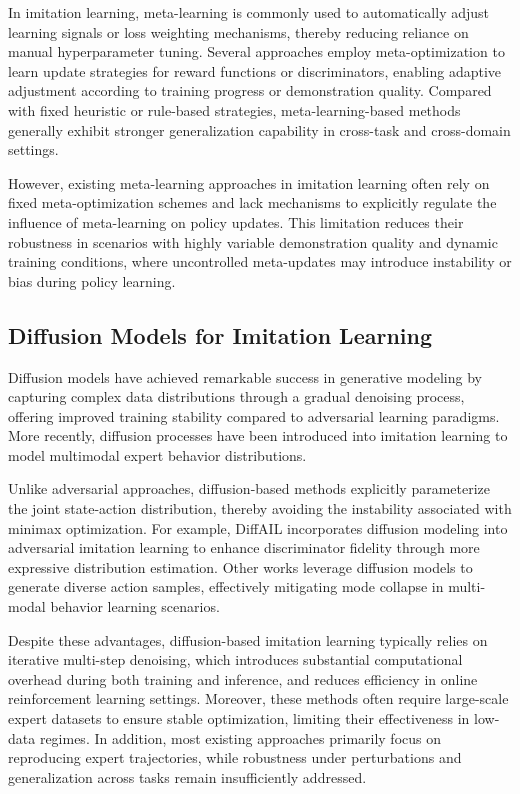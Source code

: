 \documentclass[lettersize,journal]{IEEEtran}
\begin{document}
In imitation learning, meta-learning is commonly used to automatically adjust learning signals or loss weighting mechanisms, thereby reducing reliance on manual hyperparameter tuning. Several approaches employ meta-optimization to learn update strategies for reward functions or discriminators, enabling adaptive adjustment according to training progress or demonstration quality. Compared with fixed heuristic or rule-based strategies, meta-learning-based methods generally exhibit stronger generalization capability in cross-task and cross-domain settings.

However, existing meta-learning approaches in imitation learning often rely on fixed meta-optimization schemes and lack mechanisms to explicitly regulate the influence of meta-learning on policy updates. This limitation reduces their robustness in scenarios with highly variable demonstration quality and dynamic training conditions, where uncontrolled meta-updates may introduce instability or bias during policy learning.
\subsection{Diffusion Models for Imitation Learning}
Diffusion models have achieved remarkable success in generative modeling by capturing complex data distributions through a gradual denoising process, offering improved training stability compared to adversarial learning paradigms. More recently, diffusion processes have been introduced into imitation learning to model multimodal expert behavior distributions.

Unlike adversarial approaches, diffusion-based methods explicitly parameterize the joint state-action distribution, thereby avoiding the instability associated with minimax optimization. For example, DiffAIL incorporates diffusion modeling into adversarial imitation learning to enhance discriminator fidelity through more expressive distribution estimation. Other works leverage diffusion models to generate diverse action samples, effectively mitigating mode collapse in multi-modal behavior learning scenarios.

Despite these advantages, diffusion-based imitation learning typically relies on iterative multi-step denoising, which introduces substantial computational overhead during both training and inference, and reduces efficiency in online reinforcement learning settings. Moreover, these methods often require large-scale expert datasets to ensure stable optimization, limiting their effectiveness in low-data regimes. In addition, most existing approaches primarily focus on reproducing expert trajectories, while robustness under perturbations and generalization across tasks remain insufficiently addressed.
\end{document}
